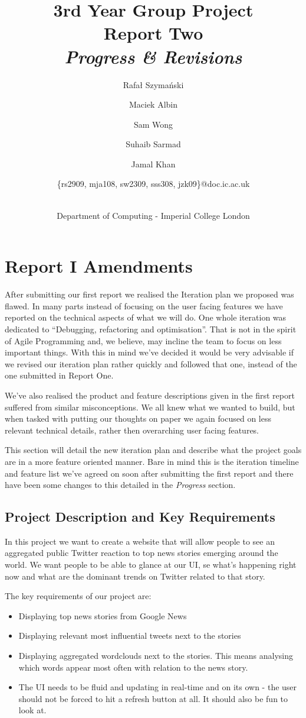 \documentclass[a4paper,12pt]{article}
\title{3rd Year Group Project\\Report Two\\\emph{Progress \& Revisions}}
\author{
    \small{Rafał Szymański}\\
  	\and
    \small{Maciek Albin}\\
    \and
    \small{Sam Wong}\\
    \and
    \small{Suhaib Sarmad}\\
		\and
		\small{Jamal Khan}\\
		\and
		\small{\{rs2909, mja108, sw2309, sss308, jzk09\}@doc.ic.ac.uk}
		\and
		\\Department of Computing - Imperial College London
}
\date{}
\begin{document}
 
	\maketitle
	
	\section{Report I Amendments}
  After submitting our first report we realised the Iteration plan we proposed was flawed. In many parts instead of focusing on the user facing features we have reported on the technical aspects of what we will do. One whole iteration was dedicated to ``Debugging, refactoring and optimisation''. That is not in the spirit of Agile Programming and, we believe, may incline the team to focus on less important things. With this in mind we've decided it would be very advisable if we revised our iteration plan rather quickly and followed that one, instead of the one submitted in Report One.

  We've also realised the product and feature descriptions given in the first report suffered from similar misconceptions. We all knew what we wanted to build, but when tasked with putting our thoughts on paper we again focused on less relevant technical details, rather then overarching user facing features.

  This section will detail the new iteration plan and describe what the project goals are in a more feature oriented manner. Bare in mind this is the iteration timeline and feature list we've agreed on soon after submitting the first report and there have been some changes to this detailed in the \emph{Progress} section. 

  \subsection{Project Description and Key Requirements}
  In this project we want to create a website that will allow people to see an aggregated public Twitter reaction to top news stories emerging around the world. We want people to be able to glance at our UI, se what's happening right now and what are the dominant trends on Twitter related to that story.

  The key requirements of our project are:
  \begin{itemize}
   \item Displaying top news stories from Google News
   \item Displaying relevant most influential tweets next to the stories
   \item Displaying aggregated wordclouds next to the stories. This means analysing which words appear most often with relation to the news story.
   \item The UI needs to be fluid and updating in real-time and on its own - the user should not be forced to hit a refresh button at all. It should also be fun to look at.
  \end{itemize}
\end{document}
